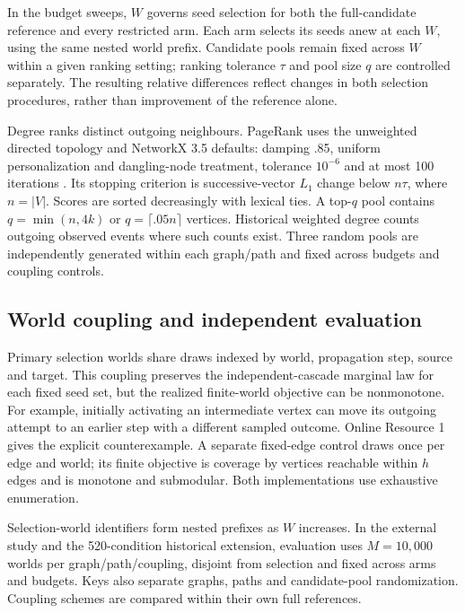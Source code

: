 \documentclass[smallextended]{svjour3}
\begin{document}
In the budget sweeps, $W$ governs seed selection for both the full-candidate reference and every restricted arm. Each arm selects its seeds anew at each $W$, using the same nested world prefix. Candidate pools remain fixed across $W$ within a given ranking setting; ranking tolerance $\tau$ and pool size $q$ are controlled separately. The resulting relative differences reflect changes in both selection procedures, rather than improvement of the reference alone.

Degree ranks distinct outgoing neighbours. PageRank uses the unweighted directed topology and NetworkX 3.5 defaults: damping .85, uniform personalization and dangling-node treatment, tolerance $10^{-6}$ and at most 100 iterations \cite{networkxpr}. Its stopping criterion is successive-vector $L_1$ change below $n\tau$, where $n=|V|$. Scores are sorted decreasingly with lexical ties. A top-$q$ pool contains $q=\min(n,4k)$ or $q=\lceil .05n\rceil$ vertices. Historical weighted degree counts outgoing observed events where such counts exist. Three random pools are independently generated within each graph/path and fixed across budgets and coupling controls.

\subsection{World coupling and independent evaluation}\label{sec:coupling}
Primary selection worlds share draws indexed by world, propagation step, source and target. This coupling preserves the independent-cascade marginal law for each fixed seed set, but the realized finite-world objective can be nonmonotone. For example, initially activating an intermediate vertex can move its outgoing attempt to an earlier step with a different sampled outcome. Online Resource 1 gives the explicit counterexample. A separate fixed-edge control draws once per edge and world; its finite objective is coverage by vertices reachable within $h$ edges and is monotone and submodular. Both implementations use exhaustive enumeration.

Selection-world identifiers form nested prefixes as $W$ increases. In the external study and the 520-condition historical extension, evaluation uses $M=10,000$ worlds per graph/path/coupling, disjoint from selection and fixed across arms and budgets. Keys also separate graphs, paths and candidate-pool randomization. Coupling schemes are compared within their own full references.
\end{document}
